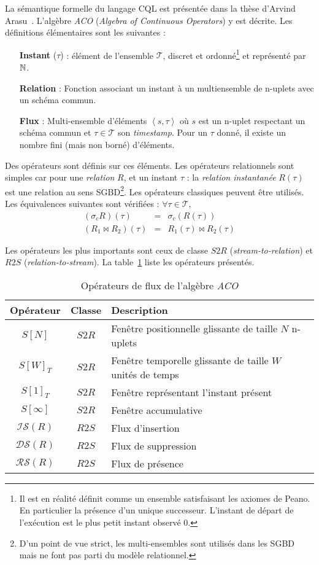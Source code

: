 La sémantique formelle du langage CQL est présentée dans la thèse d'Arvind Arasu~\cite{Arasu:queries}. L'algèbre \textit{ACO} (\textit{Algebra of Continuous Operators}) y est décrite. Les définitions élémentaires sont les suivantes :
\begin{itemize}
 \item[\textbf{Instant} ($\tau$)] : élément de l'ensemble $\mathcal T$, discret et ordonné\footnote{Il est en réalité définit comme un ensemble satisfaisant les axiomes de Peano. En particulier la présence d'un unique successeur. L'instant de départ de l'exécution est le plus petit instant observé $0$.} et représenté par $\mathbb{N}$.
 \item[\textbf{Relation}] : Fonction associant un instant à un multiensemble de n-uplets avec un schéma commun.
 \item[\textbf{Flux}] : Multi-ensemble d'éléments $\left<s,\tau\right>$ où $s$ est un n-uplet respectant un schéma commun et $\tau \in \mathcal T$ son \textit{timestamp}. Pour un $\tau$ donné, il existe un nombre fini (mais non borné) d'éléments.
\end{itemize}
Des opérateurs sont définis sur ces éléments. Les opérateurs relationnels sont simples car pour une \textit{relation} $R$, et un instant $\tau$ : la \textit{relation instantanée} $R(\tau)$ est une relation au sens SGBD\footnote{D'un point de vue strict, les multi-ensembles sont utilisés dans les SGBD mais ne font pas parti du modèle relationnel.}. Les opérateurs classiques peuvent être utilisés. Les équivalences suivantes sont vérifiées : $\forall \tau\in\mathcal T,$ 
\begin{eqnarray*}
    (\sigma_c R)(\tau) & = & \sigma_c(R(\tau))\\
    (R_1 \Join R_2)(\tau) & = & R_1(\tau) \Join R_2(\tau)
\end{eqnarray*}

Les opérateurs les plus importants sont ceux de classe $S2R$ (\textit{stream-to-relation}) et $R2S$ (\textit{relation-to-stream}). La table~\ref{tab:rw:sgfd:acostream} liste les opérateurs présentés.

\begin{table}[ht]
 \centering
\begin{tabular}{|c|c|l|}\bottomrule
Opérateur & Classe & Description \\\toprule \bottomrule
$S[N]$ & $S2R$ & Fenêtre positionnelle glissante de taille $N$ n-uplets \\ \hline
$S[W]_T$ & $S2R$ & Fenêtre temporelle glissante de taille $W$ unités de temps \\\hline
$S[1]_T$ & $S2R$ & Fenêtre représentant l'instant présent\\\hline
$S[\infty]$ & $S2R$ & Fenêtre accumulative\\ \toprule \bottomrule
$\mathcal{IS}(R)$ & $R2S$ & Flux d'insertion \\ \hline
$\mathcal{DS}(R)$ & $R2S$ & Flux de suppression \\ \hline
$\mathcal{RS}(R)$ & $R2S$ & Flux de présence \\ \toprule
\end{tabular}
\caption{Opérateurs de flux de l'algèbre \textit{ACO}}\label{tab:rw:sgfd:acostream}
\end{table}

